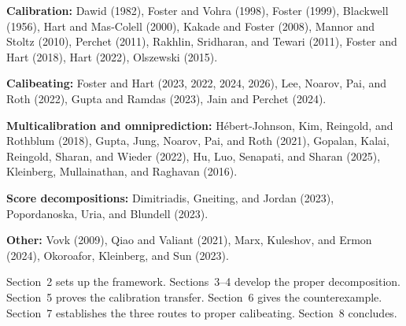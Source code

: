 \medskip\noindent\textbf{Calibration:}
Dawid (1982),
Foster and Vohra (1998),
Foster (1999),
Blackwell (1956),
Hart and Mas-Colell (2000),
Kakade and Foster (2008),
Mannor and Stoltz (2010),
Perchet (2011),
Rakhlin, Sridharan, and Tewari (2011),
Foster and Hart (2018),
Hart (2022),
Olszewski (2015).

\medskip\noindent\textbf{Calibeating:}
Foster and Hart (2023, 2022, 2024, 2026),
Lee, Noarov, Pai, and Roth (2022),
Gupta and Ramdas (2023),
Jain and Perchet (2024).

\medskip\noindent\textbf{Multicalibration and omniprediction:}
H\'{e}bert-Johnson, Kim, Reingold, and Rothblum (2018),
Gupta, Jung, Noarov, Pai, and Roth (2021),
Gopalan, Kalai, Reingold, Sharan, and Wieder (2022),
Hu, Luo, Senapati, and Sharan (2025),
Kleinberg, Mullainathan, and Raghavan (2016).

\medskip\noindent\textbf{Score decompositions:}
Dimitriadis, Gneiting, and Jordan (2023),
Popordanoska, Uria, and Blundell (2023).

\medskip\noindent\textbf{Other:}
Vovk (2009),
Qiao and Valiant (2021),
Marx, Kuleshov, and Ermon (2024),
Okoroafor, Kleinberg, and Sun (2023).

\medskip\noindent
Section~2 sets up the framework.  Sections~3--4 develop the proper
decomposition.  Section~5 proves the calibration transfer.  Section~6
gives the counterexample.  Section~7 establishes the three routes to
proper calibeating.  Section~8 concludes.
